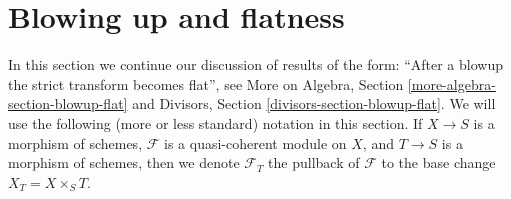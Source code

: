 \section{Blowing up and flatness}
\label{section-blowup-flat}

\noindent
In this section we continue our discussion of results of the form: ``After a
blowup the strict transform becomes flat'', see
More on Algebra, Section \ref{more-algebra-section-blowup-flat} and
Divisors, Section \ref{divisors-section-blowup-flat}.
We will use the following
(more or less standard) notation in this section. If $X \to S$ is
a morphism of schemes, $\mathcal{F}$ is a quasi-coherent module
on $X$, and $T \to S$ is a morphism of schemes, then we denote
$\mathcal{F}_T$ the pullback of $\mathcal{F}$ to the base change
$X_T = X \times_S T$.


